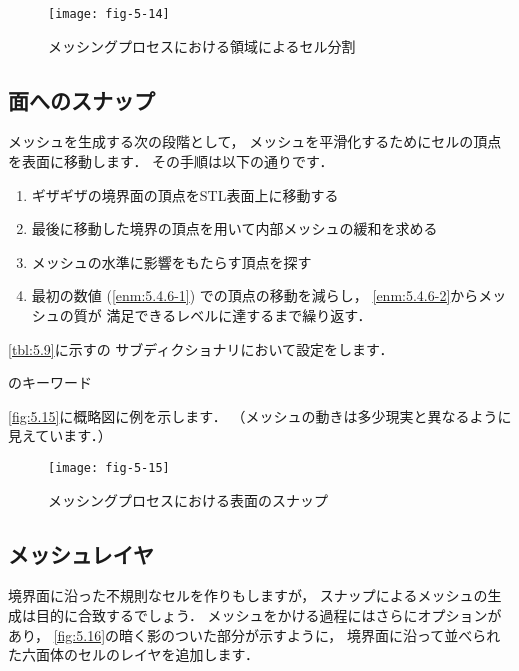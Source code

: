 \begin{figure}[ht]
 \texttt{[image: fig-5-14]}
 \caption{メッシングプロセスにおける領域によるセル分割}
 \label{fig:5.14}
\end{figure}


\subsection{面へのスナップ}
\label{ssec:5.4.6}
%
メッシュを生成する次の段階として，
メッシュを平滑化するためにセルの頂点を表面に移動します．
その手順は以下の通りです．
\begin{enumerate}
 \item\label{enm:5.4.6-1}
      ギザギザの境界面の頂点をSTL表面上に移動する
 \item\label{enm:5.4.6-2}
      最後に移動した境界の頂点を用いて内部メッシュの緩和を求める
 \item メッシュの水準に影響をもたらす頂点を探す
 \item 最初の数値 (\ref{enm:5.4.6-1}) での頂点の移動を減らし，
       \ref{enm:5.4.6-2}からメッシュの質が
       満足できるレベルに達するまで繰り返す．
\end{enumerate}
\autoref{tbl:5.9}に示すの
サブディクショナリにおいて設定をします．


\begin{table}[ht]
 
 \caption{のキーワード}
 \label{tbl:5.9}
\end{table}


\autoref{fig:5.15}に概略図に例を示します．
（メッシュの動きは多少現実と異なるように見えています．）


\begin{figure}[ht]
 \texttt{[image: fig-5-15]}
 \caption{メッシングプロセスにおける表面のスナップ}
 \label{fig:5.15}
\end{figure}


\subsection{メッシュレイヤ}
\label{ssec:5.4.7}
%
境界面に沿った不規則なセルを作りもしますが，
スナップによるメッシュの生成は目的に合致するでしょう．
メッシュをかける過程にはさらにオプションがあり，
\autoref{fig:5.16}の暗く影のついた部分が示すように，
境界面に沿って並べられた六面体のセルのレイヤを追加します．


